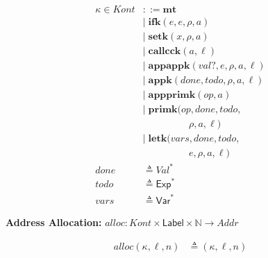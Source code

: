 \documentclass[12pt,draft]{article}
\begin{document}
{\begin{multicols*}{2}
\begin{align*}
  \kappa \in \textit{Kont} &::= \textbf{mt} \\
                     &|\; \textbf{ifk}(e, e, \rho, a) \\
                     &|\; \textbf{setk}(x, \rho, a) \\
                     &|\; \textbf{callcck}(a, \ell) \\
                     &|\; \textbf{appappk}(val?, e, \rho, a, \ell) \\
                     &|\; \textbf{appk}(done, todo, \rho, a, \ell) \\
                     &|\; \textbf{appprimk}(op, a) \\
                     &|\; \textbf{primk}(op, done, todo, \\
                     &\;\;\;\;\;\;\;\;\;\;\;\;\;\;\;\;\;\rho, a, \ell) \\
                     &|\; \textbf{letk}(vars, done, todo, \\
                     &\;\;\;\;\;\;\;\;\;\;\;\;\;\;\;\;\;e, \rho, a, \ell) \\
  done &\triangleq \textit{Val}^\ast \\
  todo &\triangleq \textsf{Exp}^* \\
  vars &\triangleq \textsf{Var}^*
\end{align*}
\begin{center}
  \textbf{Address Allocation:}
  $alloc : \textit{Kont} \times  \textsf{Label} \times\mathbb{N} \rightarrow \textit{Addr}$
\end{center}
\vspace{-6mm}
\begin{align*}
  alloc(\kappa , \ell , n) &\triangleq (\kappa , \ell , n)
\end{align*}
\end{multicols*}
}
\end{document}
